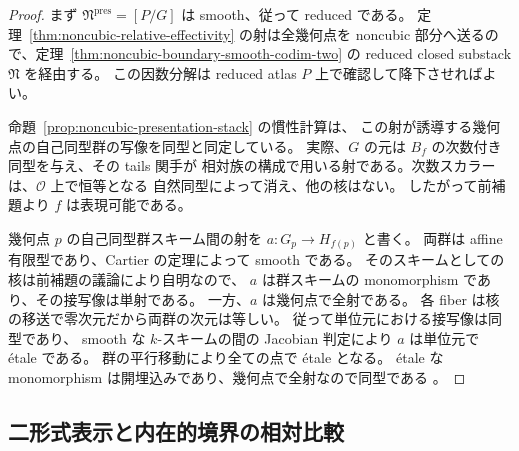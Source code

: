 \begin{proof}
まず $\mathfrak N^{\mathrm{pres}}=[P/G]$ は smooth、従って reduced である。
定理~\ref{thm:noncubic-relative-effectivity} の射は全幾何点を
noncubic 部分へ送るので、定理~\ref{thm:noncubic-boundary-smooth-codim-two}
の reduced closed substack $\mathfrak N$ を経由する。
この因数分解は reduced atlas $P$ 上で確認して降下させればよい。

命題~\ref{prop:noncubic-presentation-stack} の慣性計算は、
この射が誘導する幾何点の自己同型群の写像を同型と同定している。
実際、$G$ の元は $B_f$ の次数付き同型を与え、その tails 関手が
相対族の構成で用いる射である。次数スカラーは、$\mathcal O$ 上で恒等となる
自然同型によって消え、他の核はない。
したがって前補題より $f$ は表現可能である。

幾何点 $p$ の自己同型群スキーム間の射を $a:G_p\to H_{f(p)}$ と書く。
両群は affine 有限型であり、Cartier の定理によって smooth である。
そのスキームとしての核は前補題の議論により自明なので、
$a$ は群スキームの monomorphism であり、その接写像は単射である。
一方、$a$ は幾何点で全射である。
各 fiber は核の移送で零次元だから両群の次元は等しい。
従って単位元における接写像は同型であり、
smooth な $k$-スキームの間の Jacobian 判定により $a$ は単位元で étale である。
群の平行移動により全ての点で étale となる。
étale な monomorphism は開埋込みであり、幾何点で全射なので同型である
\cite[Tag 025G, Theorem 41.14.1]{StacksBoundaryComparison}。
\end{proof}

\subsection{二形式表示と内在的境界の相対比較}

